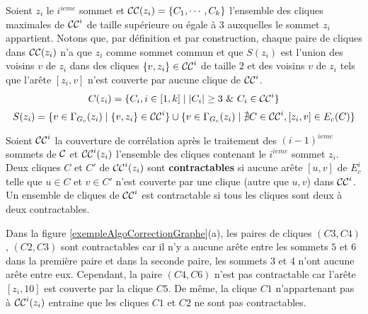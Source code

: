 Soient $z_i$ le $i^{ieme}$ sommet et ${\cal CC}(z_i) = \{C_1, \cdots, C_k\}$ l'ensemble des cliques maximales de ${\cal CC}^i$ de taille sup\'erieure ou \'egale \`a $3$ auxquelles le sommet $z_i$ appartient.
Notons que, par d\'efinition et par construction, chaque paire de cliques dans ${\cal CC}(z_i)$ n'a que $z_i$ comme sommet commun et que $S(z_i)$ est l'union des voisins $v$ de $z_i$ dans des cliques $\{v,z_i\} \in {\cal CC}^i$ de taille $2$ et des voisins $v$ de $z_i$ tels que l'ar\^ete $[z_i,v]$ n'est couverte par aucune clique de ${\cal CC}^i$.
\begin{equation}
C(z_i) = \{C_i, i \in [1,k] \mid  |C_i| \ge 3 \mbox{ } \&  \mbox{ } C_i \in {\cal CC}^i \} 
\end{equation}
\begin{equation}
S(z_i) = \{v \in \Gamma_{G_c}(z_i) \mid \{v,z_i\} \in {\cal CC}^i\} \cup  \{ v \in \Gamma_{G_c}(z_i) \mid \nexists C \in {\cal CC}^{i} , [z_i,v] \in E_c(C) \}
\end{equation}

\begin{definition}
Soient 
${\cal CC}^{i}$ la couverture de corr\'elation apr\`es le traitement des $(i-1)^{ieme}$ sommets de ${\cal C}$ et
${\cal CC}^{i}(z_i)$ l'ensemble des cliques contenant le $i^{ieme}$  sommet $z_i$.
\newline
Deux cliques $C$ et $C'$ de ${\cal CC}^{i}(z_i)$ sont {\bf contractables} si aucune ar\^ete $[u,v]$ de $E_c^i$ telle que $u \in C$ et $v \in C'$ n'est couverte par une clique (autre que ${u,v}$) dans ${\cal CC}^{i}$.
Un ensemble de cliques de ${\cal CC}^{i}$ est contractable si tous les cliques sont deux \`a deux contractables.
\end{definition}
Dans la figure \ref{exempleAlgoCorrectionGraphe}(a), les paires de cliques $(C3, C4)$, $(C2, C3)$ sont contractables car il n'y a aucune ar\^ete entre les sommets $5$ et $6$ dans la premi\`ere paire et dans la seconde paire, les sommets $3$ et $4$ n'ont aucune ar\^ete entre eux. 
Cependant, la paire $(C4, C6)$ n'est pas contractable car l'ar\^ete $[z_i,10]$ est couverte par la clique $C5$. De m\^eme, la clique $C1$ n'appartenant pas \`a ${\cal CC}^{i}(z_i)$ entraine que les cliques $C1$ et $C2$ ne sont pas contractables.

